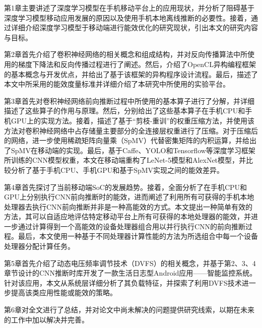 第1章主要讲述了深度学习模型在手机移动平台上的应用现状，并分析了阻碍基于深度学习模型移动应用发展的原因以及使用手机本地离线推断的必要性。接着，通过详细介绍深度学习模型于移动端进行能效优化的研究现状，引出本文的研究内容与目标。

第2章首先介绍了卷积神经网络的相关概念和组成结构，并对反向传播算法中所使用的梯度下降法和反向传播过程进行了阐述。然后，介绍了OpenCL异构编程框架的基本概念与开发优点，并给出了基于该框架的异构程序设计流程。最后，描述了本文中所采用的能效度量标准并详细介绍了本研究中所使用的实验平台。

第3章首先对卷积神经网络前向推断过程中所使用的基本算子进行了分解，并详细描述了这些算子的作用与原理。然后，分别给出了这些基本算子在手机CPU和手机GPU上的实现方法。接着，描述了基于“剪枝-重训”的权重压缩方法，并使用该方法对卷积神经网络中占存储量主要部分的全连接层权重进行了压缩。对于压缩后的网络，进一步使用稀疏矩阵向量乘（SpMV）代替密集矩阵的内积运算，并给出了SpMV在移动端的实现。最后，基于Caffe、YOLO和Tensorflow等深度学习框架所训练的CNN模型权重，本文在移动端重构了LeNet-5\cite{lecun1998gradient}模型和AlexNet模型，并比较分析了基于手机CPU、手机GPU和基于SpMV实现之间的能效差异。

第4章首先探讨了当前移动端SoC的发展趋势。接着，全面分析了在手机CPU和GPU上分别执行CNN前向推断时的能效，进而阐述了利用所有可获得的手机本地处理器去执行CNN前向推断并非是一种高能效的方式。本文提出一种简单有效的方法，其可以自适应地评估特定移动平台上所有可获得的本地处理器的能效，并进一步通过计算得到一个高能效的设备处理器组合用以并行执行CNN的前向推断过程\cite{wang2017rethinking}。最后，本文使用一种基于不同处理器计算性能的方法为所选组合中每一个设备处理器分配计算任务。

第5章首先介绍了动态电压频率调节技术（DVFS）的相关概念，并基于第2、3、4章节设计的CNN推断时库开发了一款生活日志型Android应用——智能监控系统。针对该应用，本文从系统层详细分析了其负载特征，并探索了利用DVFS技术进一步提高该类应用性能或能效的策略。

第6章对全文进行了总结，并对论文中尚未解决的问题提供研究线索，以期在未来的工作中加以解决并完善。

\cleardoublepage 